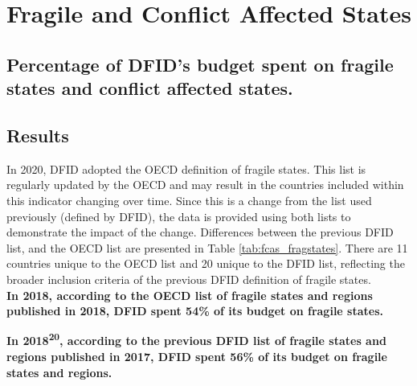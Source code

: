 \chapter{Fragile and Conflict Affected States}

\section*{Percentage of DFID's budget spent on fragile states and conflict affected states.}

\bigskip
\bigskip

\thispagestyle{empty}


\section{Results}

In 2020, DFID adopted the OECD definition of fragile states. %
This list is regularly updated by the OECD and may result in the countries included within this indicator changing over time. %
Since this is a change from the list used previously (defined by DFID), the data is provided using both lists to demonstrate the impact of the change. %
Differences between the previous DFID list, and the OECD list are presented in Table \ref{tab:fcas_fragstates}. %
There are 11 countries unique to the OECD list and 20 unique to the DFID list, reflecting the broader inclusion criteria of the previous DFID definition of fragile states. \\ %

\noindent\textbf{In 2018\footnotemark, according to the OECD list of fragile states and regions published in 2018, DFID spent 54\% of its budget on fragile states.} \\ %


\noindent\textbf{In 2018\textsuperscript{20}, according to the previous DFID list of fragile states and regions published in 2017, DFID spent 56\% of its budget on fragile states and regions.} \\ %







